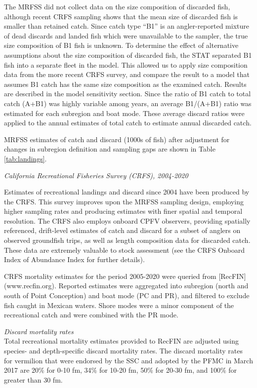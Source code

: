 \documentclass[
  english,
  a4paper,
]{article}
\begin{document}
The MRFSS did not collect data on the size composition of discarded fish, although recent CRFS sampling shows that the mean size of discarded fish is smaller than retained catch. Since catch type ``B1'' is an angler-reported mixture of dead discards and landed fish which were unavailable to the sampler, the true size composition of B1 fish is unknown. To determine the effect of alternative assumptions about the size composition of discarded fish, the STAT separated B1 fish into a separate fleet in the model. This allowed us to apply size composition data from the more recent CRFS survey, and compare the result to a model that assumes B1 catch has the same size composition as the examined catch. Results are described in the model sensitivity section. Since the ratio of B1 catch to total catch (A+B1) was highly variable among years, an average B1/(A+B1) ratio was estimated for each subregion and boat mode. These average discard ratios were applied to the annual estimates of total catch to estimate annual discarded catch.

MRFSS estimates of catch and discard (1000s of fish) after adjustment for
changes in subregion definition and sampling gaps are shown in Table \ref{tab:landings}.

\emph{California Recreational Fisheries Survey (CRFS), 2004-2020}

Estimates of recreational landings and discard since 2004 have been produced by
the CRFS. This survey improves upon the MRFSS sampling design, employing higher
sampling rates and producing estimates with finer spatial and temporal resolution. The CRFS also employs onboard CPFV observers, providing spatially referenced, drift-level estimates of catch and discard for a subset of anglers on observed groundfish trips, as well as length composition data for discarded catch. These data are extremely valuable to stock assessment (see the CRFS Onboard Index of Abundance Index for
further details).

CRFS mortality estimates for the period 2005-2020 were queried from {[}RecFIN{]} (www.recfin.org).
Reported estimates were aggregated into subregion (north and south of Point Conception) and boat mode (PC and PR), and filtered to exclude fish
caught in Mexican waters. Shore modes were a minor component of the recreational catch and were combined with the PR mode.

\emph{Discard mortality rates}\\
Total recreational mortality estimates provided to RecFIN are
adjusted using species- and depth-specific discard mortality rates.
The discard mortality rates for vermilion that were endorsed by the
SSC and adopted by the
PFMC in March 2017 are 20\% for 0-10 fm, 34\% for 10-20 fm, 50\% for 20-30 fm, and
100\% for greater than 30 fm.
\end{document}
